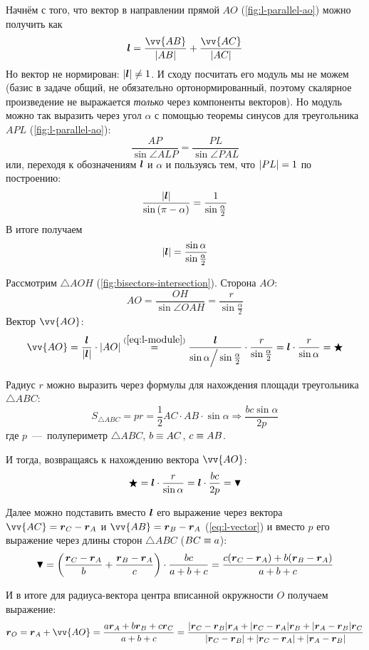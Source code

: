 \documentclass[a4paper,12pt]{article}
\begin{document}
\begin{solution}
    Начнём с того, что вектор в направлении прямой $AO$ (\ref{fig:l-parallel-ao}) можно получить как
    \begin{equation}\label{eq:l-vector}
      \bds l = \frac{\vv{AB}}{|AB|} + \frac{\vv{AC}}{|AC|}
    \end{equation}
    Но вектор не нормирован: $|\bds l| \hm{\not=} 1$.
    И сходу посчитать его модуль мы не можем (базис в задаче общий, не обязательно ортонормированный, поэтому скалярное произведение не выражается \emph{только} через компоненты векторов).
    Но модуль можно так выразить через угол $\alpha$ с помощью теоремы синусов для треугольника $APL$ (\ref{fig:l-parallel-ao}):
    \[
      \frac{AP}{\sin{\angle ALP}} = \frac{PL}{\sin{\angle PAL}}
    \]
    или, переходя к обозначениям $\boldsymbol l$ и $\alpha$ и пользуясь тем, что $|PL| \hm= 1$ по построению:
    \[
      \frac{|\boldsymbol l|}{\sin{(\pi - \alpha)}} = \frac{1}{\sin \frac{\alpha}{2}}
    \]
    В итоге получаем
    \begin{equation}\label{eq:l-module}
      |\boldsymbol l| = \frac{\sin \alpha}{\sin \frac{\alpha}{2}}
    \end{equation}
    
    Рассмотрим $\triangle AOH$ (\ref{fig:bisectors-intersection}).
    Сторона $AO$:
    \[
      AO = \frac{OH}{\sin \angle OAH} = \frac{r}{\sin \frac{\alpha}{2}}
    \]
    Вектор $\vv{AO}$:
    \[
      \vv{AO} = \frac{\bds l}{|\bds l|} \cdot |AO|
        \stackrel{(\ref{eq:l-module})}{=} \frac{\bds l}{\sin \alpha \Big/ \sin \frac{\alpha}{2}} \cdot \frac{r}{\sin \frac{\alpha}{2}}
        = \bds l \cdot \frac{r}{\sin \alpha}
        = \bigstar
    \]
    
    Радиус $r$ можно выразить через формулы для нахождения площади треугольника $\triangle ABC$:
    \[
      S_{\triangle ABC} = pr = \frac{1}{2} AC \cdot AB \cdot \sin \alpha
        \Rightarrow \frac{bc \sin \alpha}{2p}
    \]
    где $p$~---~полупериметр $\triangle ABC$, $b \hm\equiv AC$, $c \hm\equiv AB$.
    
    И тогда, возвращаясь к нахождению вектора $\vv{AO}$:
    \[
      \bigstar = \boldsymbol l \cdot \frac{r}{\sin \alpha}
        = \boldsymbol l \cdot \frac{bc}{2p}
        = \blacktriangledown
    \]
    
    Далее можно подставить вместо $\boldsymbol l$ его выражение через вектора $\vv{AC} \hm= \bds r_C \hm- \bds r_A$ и $\vv{AB} \hm= \bds r_B \hm- \bds r_A$ (\ref{eq:l-vector}) и вместо $p$ его выражение через длины сторон $\triangle ABC$ ($BC \hm\equiv a$):
    \[
      \blacktriangledown = \left(\frac{\boldsymbol r_C - \boldsymbol r_A}{b} + \frac{\boldsymbol r_B - \boldsymbol r_A}{c}\right) \cdot \frac{bc}{a + b + c}
        = \frac{c(\boldsymbol r_C - \boldsymbol r_A) + b(\boldsymbol r_B - \boldsymbol r_A)}{a + b + c}
    \]
    
    И в итоге для радиуса-вектора центра вписанной окружности $O$ получаем выражение:
    \[
      \bds r_O = \bds r_A + \vv{AO}
        = \frac{a \bds r_A + b \bds r_B + c \bds r_C}{a + b + c}
        = \frac{|\bds r_C - \bds r_B| \bds r_A + |\bds r_C - \bds r_A| \bds r_B + |\bds r_A - \bds r_B| \bds r_C}{|\bds r_C - \bds r_B| + |\bds r_C - \bds r_A| + |\bds r_A - \bds r_B|}
    \]
  \end{solution}
  
\end{document}
